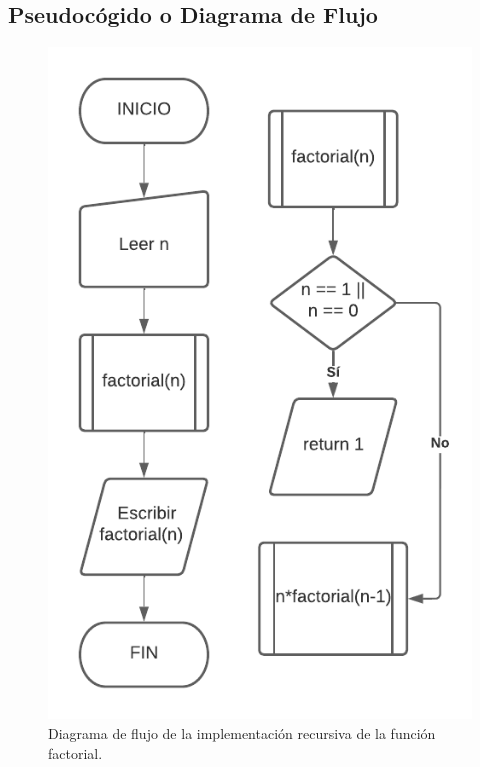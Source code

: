 \subsection{Pseudocógido o Diagrama de Flujo}
\begin{figure}[H]
	\centering
	\includegraphics[scale=0.5]{img/problema5.pdf}
	\caption{Diagrama de flujo de la implementación recursiva de la función factorial.}
	\label{DFp5}
\end{figure}


